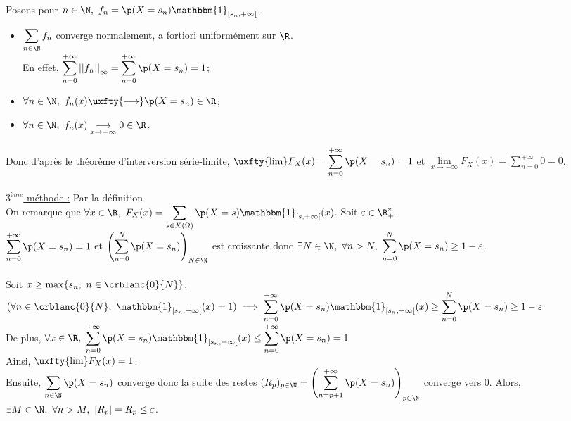 \documentclass[8pt]{book}
\begin{document}
\begin{enumerate}
		Posons pour $n\in \N,\ f_n=\p(X=s_n)\mathbbm{1}_{[s_n,+\infty[}$.\\
		\begin{itemize}
			\item $\displaystyle\sum\limits_{n\in \N}f_n$ converge normalement, a fortiori uniformément sur $\R$.\\
			En effet, $\displaystyle\sum\limits_{n=0}^{+\infty}{||f_n||}_\infty=\sum\limits_{n=0}^{+\infty}\p(X=s_n)=1$;
			\item $\forall n\in \N,\ f_n(x)\uxfty{\longrightarrow}\p(X=s_n)\in \R$;
			\item $\forall n\in \N,\ f_n(x)\underset{x\to -\infty}{\longrightarrow}0\in \R$.
		\end{itemize}
		Donc d'après le théorème d'interversion série-limite, $\uxfty{\lim}F_X(x)=\displaystyle\sum\limits_{n=0}^{+\infty}\p(X=s_n)=1$ et $\underset{x\to -\infty}{\lim}F_X(x)=\displaystyle\sum\limits_{n=0}^{+\infty}0=0$.\\\\
		\underline{$3^{ème}$ méthode :} Par la définition\\
		On remarque que $\forall x\in \R,\ F_X(x)=\displaystyle\sum\limits_{s\in X(\Omega)}\p(X=s)\mathbbm{1}_{[s,+\infty[}(x)$. Soit $\varepsilon\in \R^*_+$.\\
		$\displaystyle\sum\limits_{n=0}^{+\infty}\p(X=s_n)=1$ et $\left(\displaystyle\sum\limits_{n=0}^{N}\p(X=s_n)\right)_{N\in \N}$ est croissante donc $\exists N\in \N,\ \forall n>N,\ \displaystyle\sum\limits_{n=0}^{N}\p(X=s_n)\geq 1-\varepsilon$.\\\\
		Soit $x\geq \max\{s_n,\ n\in \crblanc{0}{N}\}$.\\
		$(\forall n\in \crblanc{0}{N},\ \mathbbm{1}_{[s_n,+\infty[}(x)=1)\implies\displaystyle\sum\limits_{n=0}^{+\infty}\p(X=s_n)\mathbbm{1}_{[s_n,+\infty[}(x)\geq \sum\limits_{n=0}^{N}\p(X=s_n)\geq 1-\varepsilon$\\
		De plus, $\forall x\in \R,\ \displaystyle\sum\limits_{n=0}^{+\infty}\p(X=s_n)\mathbbm{1}_{[s_n,+\infty[}(x)\leq \sum\limits_{n=0}^{+\infty}\p(X=s_n)=1$\\
		Ainsi, $\uxfty{\lim}F_X(x)=1$.\\
		Ensuite, $\displaystyle\sum\limits_{n\in \N}\p(X=s_n)$ converge donc la suite des restes $(R_p)_{p\in \N}=\left(\displaystyle\sum\limits_{n=p+1}^{+\infty}\p(X=s_n)\right)_{p\in \N}$ converge vers $0$. Alors, $\exists M\in \N,\ \forall n>M,\ |R_p|=R_p\leq \varepsilon$.\\\\

\end{enumerate}
\end{document}
